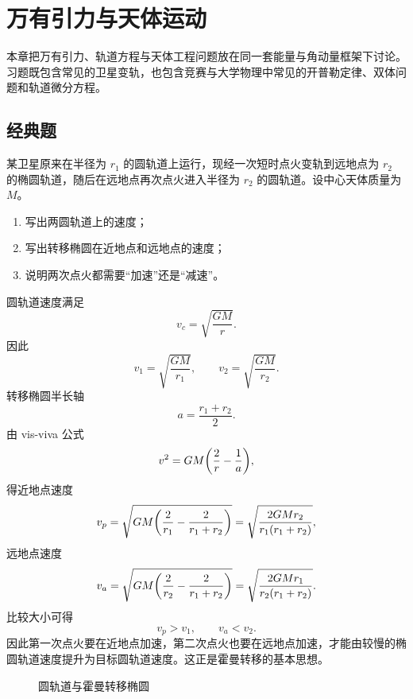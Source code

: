 \chapter{万有引力与天体运动}

本章把万有引力、轨道方程与天体工程问题放在同一套能量与角动量框架下讨论。习题既包含常见的卫星变轨，也包含竞赛与大学物理中常见的开普勒定律、双体问题和轨道微分方程。

\section{经典题}

\begin{classic}
某卫星原来在半径为 $r_1$ 的圆轨道上运行，现经一次短时点火变轨到远地点为 $r_2$ 的椭圆轨道，随后在远地点再次点火进入半径为 $r_2$ 的圆轨道。设中心天体质量为 $M$。
\begin{enumerate}
  \item 写出两圆轨道上的速度；
  \item 写出转移椭圆在近地点和远地点的速度；
  \item 说明两次点火都需要“加速”还是“减速”。
\end{enumerate}
\begin{solution}
圆轨道速度满足
\[
v_c=\sqrt{\frac{GM}{r}}.
\]
因此
\[
v_1=\sqrt{\frac{GM}{r_1}},\qquad v_2=\sqrt{\frac{GM}{r_2}}.
\]
转移椭圆半长轴
\[
a=\frac{r_1+r_2}{2}.
\]
由 vis-viva 公式
\[
v^2=GM\qty(\frac{2}{r}-\frac{1}{a}),
\]
得近地点速度
\[
v_p=\sqrt{GM\qty(\frac{2}{r_1}-\frac{2}{r_1+r_2})}
=\sqrt{\frac{2GMr_2}{r_1(r_1+r_2)}},
\]
远地点速度
\[
v_a=\sqrt{GM\qty(\frac{2}{r_2}-\frac{2}{r_1+r_2})}
=\sqrt{\frac{2GMr_1}{r_2(r_1+r_2)}}.
\]
比较大小可得
\[
v_p>v_1,\qquad v_a<v_2.
\]
因此第一次点火要在近地点加速，第二次点火也要在远地点加速，才能由较慢的椭圆轨道速度提升为目标圆轨道速度。这正是霍曼转移的基本思想。

\begin{figure}[H]
\centering
{}
\caption{圆轨道与霍曼转移椭圆}
\end{figure}
\end{solution}
\end{classic}

